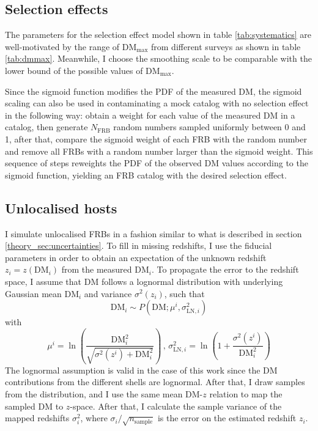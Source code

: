\subsection{Selection effects}
The parameters for the selection effect model shown in table \ref{tab:systematics} are well-motivated by the range of $\mathrm{DM}_\mathrm{max}$ from different surveys as shown in table \ref{tab:dmmax}. Meanwhile, I choose the smoothing scale to be comparable with the lower bound of the possible values of $\mathrm{DM}_\mathrm{max}$.

Since the sigmoid function modifies the PDF of the measured $\mathrm{DM}$, the sigmoid scaling can also be used in contaminating a mock catalog with no selection effect in the following way: obtain a weight for each value of the measured DM in a catalog, then generate $N_\mathrm{FRB}$ random numbers sampled uniformly between 0 and 1, after that, compare the sigmoid weight of each FRB with the random number and remove all FRBs with a random number larger than the sigmoid weight. This sequence of steps reweights the PDF of the observed DM values according to the sigmoid function, yielding an FRB catalog with the desired selection effect.



\subsection{Unlocalised hosts}
I simulate unlocalised FRBs in a fashion similar to what is described in section \ref{theory_sec:uncertainties}. To fill in missing redshifts, I use the fiducial parameters in order to obtain an expectation of the unknown redshift $z_i = z(\mathrm{DM}_i)$ from the measured $\mathrm{DM}_i$. To propagate the error to the redshift space, I assume that $\mathrm{DM}$ follows a lognormal distribution with underlying Gaussian mean  $\mathrm{DM}_i$ and variance $\sigma^2(z_i)$, such that
\begin{equation}
    \mathrm{DM}_i \sim P(\mathrm{DM}; \mu^i, \sigma_{\mathrm{LN}, i}^2)
\end{equation}
with
\begin{equation}
    \mu^i = \ln\left(\frac{\mathrm{DM}_{i}^{2}}{\sqrt{\sigma^2(z^i) + \mathrm{DM}_{i}^{2}}}\right) \, , \, \sigma_{\mathrm{LN}, i}^2 = \ln\left(1 + \frac{\sigma^2(z^i)}{\mathrm{DM}_{i}^{2}}\right)
\end{equation}
The lognormal assumption is valid in the case of this work since the $\mathrm{DM}$ contributions from the different shells are lognormal. After that, I draw samples from the distribution, and I use the same mean DM-$z$ relation to map the sampled DM to $z$-space. After that, I calculate the sample variance of the mapped redshifts $\sigma^2_{i}$, where $\sigma_i/\sqrt{n_{\mathrm{sample}}}$ is the error on the estimated redshift $z_i$.


